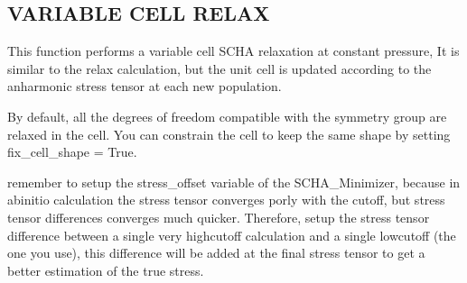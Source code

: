 \documentclass[a4paper,11pt,english]{sphinxmanual}
\begin{document}
\begin{fulllineitems}
\begin{fulllineitems}
\label{\detokenize{apireference:sscha.Relax.SSCHA.vc_relax}}
\pysigstartsignatures
{}
\pysigstopsignatures

\subsection{VARIABLE CELL RELAX}
\label{\detokenize{apireference:variable-cell-relax}}
\sphinxAtStartPar
This function performs a variable cell SCHA relaxation at constant pressure,
It is similar to the relax calculation, but the unit cell is updated according
to the anharmonic stress tensor at each new population.

\sphinxAtStartPar
By default, all the degrees of freedom compatible with the symmetry group are relaxed in the cell.
You can constrain the cell to keep the same shape by setting fix\_cell\_shape = True.
\begin{description}
\sphinxAtStartPar
remember to setup the stress\_offset variable of the SCHA\_Minimizer,
because in ab\sphinxhyphen{}initio calculation the stress tensor converges porly with the cutoff,
but stress tensor differences converges much quicker. Therefore, setup the
stress tensor difference between a single very high\sphinxhyphen{}cutoff calculation and a
single low\sphinxhyphen{}cutoff (the one you use), this difference will be added at the final
stress tensor to get a better estimation of the true stress.

\end{description}



\end{fulllineitems}
\end{fulllineitems}
\end{document}
